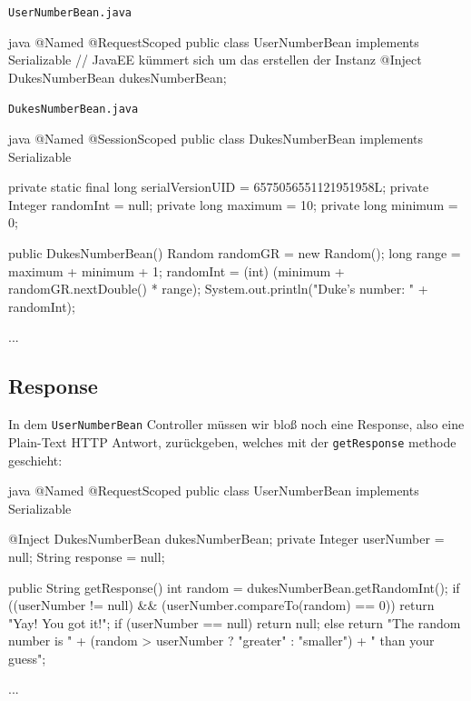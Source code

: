 \texttt{UserNumberBean.java}
\begin{code}{java}
    @Named
    @RequestScoped
    public class UserNumberBean implements Serializable {
        // JavaEE kümmert sich um das erstellen der Instanz
        @Inject
        DukesNumberBean dukesNumberBean;
    }
\end{code}

\texttt{DukesNumberBean.java}
\begin{code}{java}
    @Named
    @SessionScoped
    public class DukesNumberBean implements Serializable {

        private static final long serialVersionUID = 6575056551121951958L;
        private Integer randomInt = null;
        private long maximum = 10;
        private long minimum = 0;

        public DukesNumberBean() {
            Random randomGR = new Random();
            long range = maximum + minimum + 1;
            randomInt = (int) (minimum + randomGR.nextDouble() * range);
            System.out.println("Duke's number: " + randomInt);
        }

        ...
    }
\end{code}

\subsection{Response}

In dem \texttt{UserNumberBean} Controller müssen wir bloß noch eine Response, also eine Plain-Text HTTP Antwort, zurückgeben, welches mit der \texttt{getResponse} methode geschieht:

\begin{code}{java}
    @Named
    @RequestScoped
    public class UserNumberBean implements Serializable {
        @Inject
        DukesNumberBean dukesNumberBean;
        private Integer userNumber = null;
        String response = null;

        public String getResponse() {
            int random = dukesNumberBean.getRandomInt();
            if ((userNumber != null)
                    && (userNumber.compareTo(random) == 0)) {
                return "Yay! You got it!";
            }
            if (userNumber == null) {
                return null;
            } else {
                return "The random number is " +
                        (random > userNumber ? "greater" : "smaller") +
                        " than your guess";
            }
        }

        ...
    }
\end{code}

